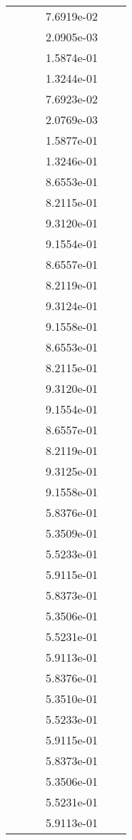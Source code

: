 \begin{xltabular}{\textwidth}{r|rS[table-format=1.3e+2]S[table-format=1.4e+2]S[table-format=1.4e+2]S[table-format=-1.5]}
&  &  & 7.6919e-02 & & \\
&  &  & 2.0905e-03 & & \\
&  &  & 1.5874e-01 & & \\
&  &  & 1.3244e-01 & & \\
&  &  & 7.6923e-02 & & \\
&  &  & 2.0769e-03 & & \\
&  &  & 1.5877e-01 & & \\
&  &  & 1.3246e-01 & & \\
&  &  & 8.6553e-01 & & \\
&  &  & 8.2115e-01 & & \\
&  &  & 9.3120e-01 & & \\
&  &  & 9.1554e-01 & & \\
&  &  & 8.6557e-01 & & \\
&  &  & 8.2119e-01 & & \\
&  &  & 9.3124e-01 & & \\
&  &  & 9.1558e-01 & & \\
&  &  & 8.6553e-01 & & \\
&  &  & 8.2115e-01 & & \\
&  &  & 9.3120e-01 & & \\
&  &  & 9.1554e-01 & & \\
&  &  & 8.6557e-01 & & \\
&  &  & 8.2119e-01 & & \\
&  &  & 9.3125e-01 & & \\
&  &  & 9.1558e-01 & & \\
&  &  & 5.8376e-01 & & \\
&  &  & 5.3509e-01 & & \\
&  &  & 5.5233e-01 & & \\
&  &  & 5.9115e-01 & & \\
&  &  & 5.8373e-01 & & \\
&  &  & 5.3506e-01 & & \\
&  &  & 5.5231e-01 & & \\
&  &  & 5.9113e-01 & & \\
&  &  & 5.8376e-01 & & \\
&  &  & 5.3510e-01 & & \\
&  &  & 5.5233e-01 & & \\
&  &  & 5.9115e-01 & & \\
&  &  & 5.8373e-01 & & \\
&  &  & 5.3506e-01 & & \\
&  &  & 5.5231e-01 & & \\
&  &  & 5.9113e-01 & & \\

\end{xltabular}
